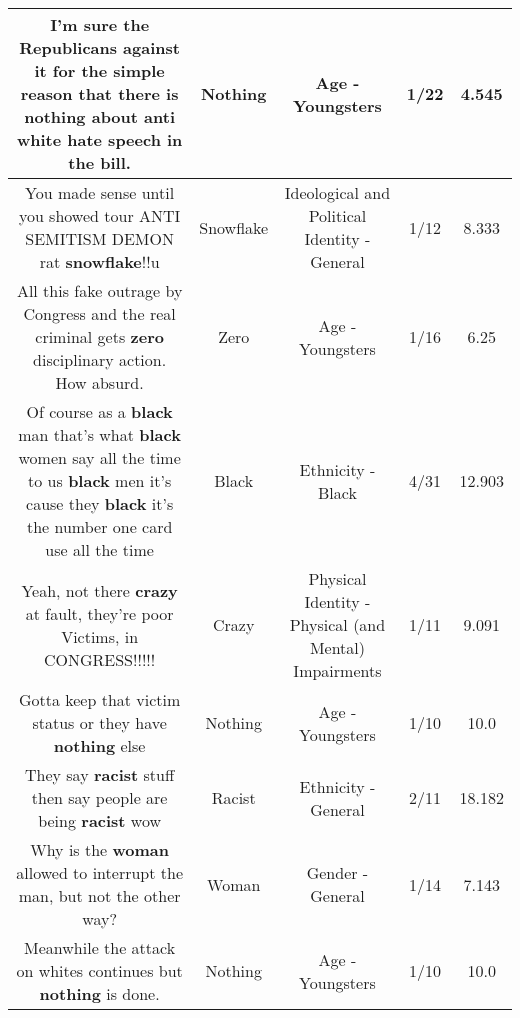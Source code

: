 \documentclass[11pt]{article}
\newlength\mylength
\begin{document}
\begin{center}
\begin{longtable}{|C{.65\mylength}|C{.30\mylength}|C{.12\mylength}|C{.12\mylength}|C{.12\mylength}|}
  \small I'm sure the Republicans against it for the simple reason that there is \textbf{nothing} about anti white hate speech in the bill.\normalsize   & Nothing & Age - Youngsters & 1/22 & 4.545 \\  \hline
  \small You made sense until you  showed tour  ANTI SEMITISM DEMON rat \textbf{snowflake}!!u\normalsize   & Snowflake &  Ideological and Political Identity - General & 1/12 & 8.333 \\  \hline
  \small All this fake outrage by Congress and the real criminal gets \textbf{zero} disciplinary action.  How absurd.\normalsize   & Zero & Age - Youngsters & 1/16 & 6.25 \\  \hline
  \small Of course as a \textbf{black} man that's what \textbf{black} women say all the time to us \textbf{black} men it's cause they \textbf{black} it's the number one card use all the time\normalsize   & Black & Ethnicity - Black & 4/31 & 12.903 \\  \hline
  \small Yeah, not there \textbf{crazy} at fault, they're poor Victims, in CONGRESS!!!!!\normalsize   & Crazy & Physical Identity - Physical (and Mental) Impairments & 1/11 & 9.091 \\  \hline
  \small Gotta keep that victim status or they have \textbf{nothing} else\normalsize   & Nothing & Age - Youngsters & 1/10 & 10.0 \\  \hline
  \small They say \textbf{racist} stuff then say people are being \textbf{racist} wow\normalsize   & Racist & Ethnicity - General & 2/11 & 18.182 \\  \hline
  \small Why is the \textbf{woman} allowed to interrupt the man, but not the other way?\normalsize   & Woman & Gender - General & 1/14 & 7.143 \\  \hline
  \small Meanwhile the attack on whites continues but \textbf{nothing} is done.\normalsize   & Nothing & Age - Youngsters & 1/10 & 10.0 \\  \hline

\end{longtable}
\end{center}
\end{document}
